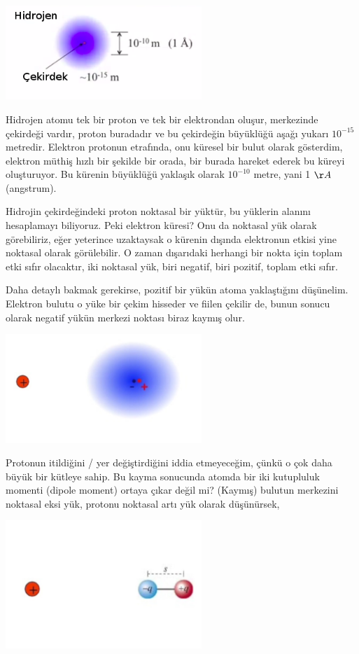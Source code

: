 \documentclass[12pt,fleqn]{article}\usepackage{../../common}
\begin{document}
\includegraphics[width=20em]{03_09.png}

Hidrojen atomu tek bir proton ve tek bir elektrondan oluşur, merkezinde
çekirdeği vardır, proton buradadır ve bu çekirdeğin büyüklüğü aşağı yukarı
$10^{-15}$ metredir. Elektron protonun etrafında, onu küresel bir bulut
olarak gösterdim, elektron müthiş hızlı bir şekilde bir orada, bir burada
hareket ederek bu küreyi oluşturuyor. Bu kürenin büyüklüğü yaklaşık olarak
$10^{-10}$ metre, yani 1 ${\AA}$ (angstrum).

Hidrojin çekirdeğindeki proton noktasal bir yüktür, bu yüklerin alanını
hesaplamayı biliyoruz. Peki elektron küresi? Onu da noktasal yük olarak
görebiliriz, eğer yeterince uzaktaysak o kürenin dışında elektronun etkisi yine
noktasal olarak görülebilir. O zaman dışarıdaki herhangi bir nokta için toplam
etki sıfır olacaktır, iki noktasal yük, biri negatif, biri pozitif, toplam etki
sıfır. 

Daha detaylı bakmak gerekirse, pozitif bir yükün atoma yaklaştığını düşünelim.
Elektron bulutu o yüke bir çekim hisseder ve fiilen çekilir de, bunun sonucu
olarak negatif yükün merkezi noktası biraz kaymış olur.

\includegraphics[width=20em]{03_10.png}

Protonun itildiğini / yer değiştirdiğini iddia etmeyeceğim, çünkü o çok daha
büyük bir kütleye sahip. Bu kayma sonucunda atomda bir iki kutupluluk momenti
(dipole moment) ortaya çıkar değil mi? (Kaymış) bulutun merkezini noktasal eksi
yük, protonu noktasal artı yük olarak düşünürsek,

\includegraphics[width=20em]{03_11.png}
\end{document}
